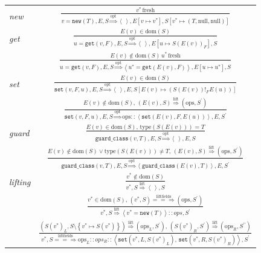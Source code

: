\documentclass{sigplanconf}
\begin{document}
\begin{figure}
\begin{center}
\begin{tabular}{lc}
\emph{new} & ${\displaystyle \frac{v^{*}\,\mathrm{fresh}}{v=\mathtt{new}(T),E,S\overset{\mathrm{opt}}{\Longrightarrow}\left\langle \,\right\rangle ,E\left[v\mapsto v^{*}\right],S\left[v^{*}\mapsto\left(T,\mathrm{null,null}\right)\right]}}$\tabularnewline[3em]
\emph{get} & ${\displaystyle \frac{E(v)\in\mathrm{dom}(S)}{u=\mathtt{get}(v,F),E,S\overset{\mathrm{opt}}{\Longrightarrow}\left\langle \,\right\rangle ,E\left[u\mapsto S(E(v))_{F}\right],S}}$\tabularnewline[3em]
 & ${\displaystyle \frac{E(v)\notin\mathrm{dom}(S)\, u^{*}\,\mathrm{fresh}}{u=\mathtt{get}(v,F),E,S\overset{\mathrm{opt}}{\Longrightarrow}\left\langle u^{*}=\mathtt{get}(E(v),F)\right\rangle ,E\left[u\mapsto u^{*}\right],S}}$\tabularnewline[3em]
\emph{set} & ${\displaystyle \frac{E(v)\in\mathrm{dom}(S)}{\mathtt{set}\left(v,F,u\right),E,S\overset{\mathrm{opt}}{\Longrightarrow}\left\langle \,\right\rangle ,E,S\left[E\left(v\right)\mapsto\left(S(E(v))!_{F}E(u)\right)\right]}}$\tabularnewline[3em]
 & ${\displaystyle \frac{E(v)\notin\mathrm{dom}\left(S\right),\,\left(E(v),S\right)\overset{\mathrm{lift}}{\Longrightarrow}\left(\mathrm{ops},S^{\prime}\right)}{\mathtt{set}\left(v,F,u\right),E,S\overset{\mathrm{opt}}{\Longrightarrow}\mathrm{ops}::\left\langle \mathtt{set}\left(E(v),F,E(u)\right)\right\rangle ,E,S^{\prime}}}$\tabularnewline[3em]
\emph{guard} & ${\displaystyle \frac{E(v)\in\mathrm{dom}(S),\,\mathrm{type}(S(E(v)))=T}{\mathtt{guard\_class}(v,T),E,S\overset{\mathrm{opt}}{\Longrightarrow}\left\langle \,\right\rangle ,E,S}}$\tabularnewline[3em]
 & ${\displaystyle \frac{E(v)\notin\mathrm{dom}(S)\vee\mathrm{type}(S(E(v)))\neq T,\,\left(E(v),S\right)\overset{\mathrm{lift}}{\Longrightarrow}\left(\mathrm{ops},S^{\prime}\right)}{\mathtt{guard\_class}(v,T),E,S\overset{\mathrm{opt}}{\Longrightarrow}\left\langle \mathtt{guard\_class}(E\left(v\right),T)\right\rangle ,E,S^{\prime}}}$\tabularnewline[3em]
\emph{lifting} & ${\displaystyle \frac{v^{*}\notin\mathrm{dom}(S)}{v^{*},S\overset{\mathrm{lift}}{\Longrightarrow}\left\langle \,\right\rangle ,S}}$\tabularnewline[3em]
 & ${\displaystyle \frac{v^{*}\in\mathrm{dom}(S),\,\left(v^{*},S\right)\overset{\mathrm{liftfields}}{=\!=\!\Longrightarrow}\left(\mathrm{ops},S^{\prime}\right)}{v^{*},S\overset{\mathrm{lift}}{\Longrightarrow}\left\langle v^{*}=\mathtt{new}\left(T\right)\right\rangle ::ops,S^{\prime}}}$\tabularnewline[3em]
 & ${\displaystyle \frac{\left(S\left(v^{*}\right)_{L},S\setminus\left\{ v^{*}\mapsto S\left(v^{*}\right)\right\} \right)\overset{\mathrm{lift}}{\Longrightarrow}\left(\mathrm{ops}_{L},S^{\prime}\right),\,\left(S\left(v^{*}\right)_{R},S^{\prime}\right)\overset{\mathrm{lift}}{\Longrightarrow}\left(\mathrm{ops}_{R},S^{\prime\prime}\right)}{v^{*},S\overset{\mathrm{liftfields}}{=\!=\!\Longrightarrow}\mathrm{ops}_{L}::ops_{R}::\left\langle \mathtt{set}\left(v^{*},L,S\left(v^{*}\right)_{L}\right),\,\mathtt{set}\left(v^{*},R,S\left(v^{*}\right)_{R}\right)\right\rangle ,S^{\prime}}}$\tabularnewline[3em]
\end{tabular}


\end{center}
\end{figure}
\end{document}
